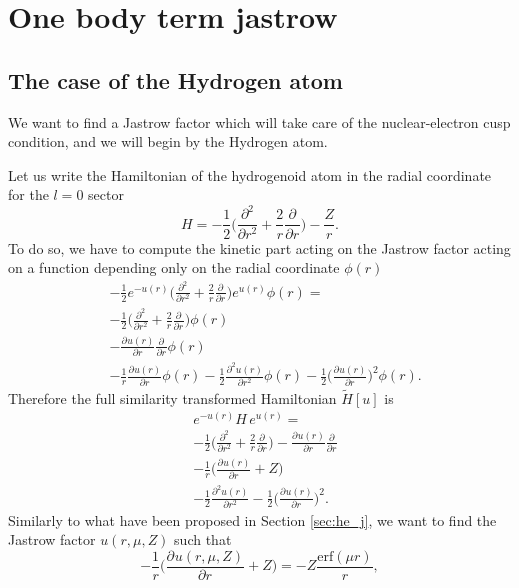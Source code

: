 \documentclass[aip,jcp,reprint,noshowkeys,superscriptaddress]{revtex4-1}
\newcommand{\deriv}[3]{\frac{\partial^{#3} #1}{\partial {#2}^{#3}}}
\begin{document}
\section{One body term jastrow}
\subsection{The case of the Hydrogen atom}
We want to find a Jastrow factor which will take care of the nuclear-electron cusp condition, and we will begin by the Hydrogen atom.  

Let us write the Hamiltonian of the hydrogenoid atom in the radial coordinate for the $l=0$ sector 
\begin{equation}
 H = -\frac{1}{2} \big( \deriv{}{r}{2} + \frac{2}{r} \deriv{}{r}{}\big) - \frac{Z}{r}.
\end{equation}
To do so, we have to compute the kinetic part acting on the Jastrow factor acting on a function depending only on the radial coordinate $\phi( r)$
\begin{equation}
 \label{eq:h_atom_j}
 \begin{aligned}
 & -\frac{1}{2}e^{-u(r)}\big(\deriv{}{r}{2} + \frac{2}{r} \deriv{}{r}{} \big) e^{u(r)}\phi(r)  = \\
 & -\frac{1}{2}\big( \deriv{}{r}{2} + \frac{2}{r} \deriv{}{r}{} \big) \phi(r) \\
 &-\deriv{u(r)}{r}{}\deriv{}{r}{}\phi(r) \\
 &-\frac{1}{r}\deriv{u(r)}{r}{}\phi(r)  - \frac{1}{2}\deriv{u(r)}{r}{2}\phi(r)  -  \frac{1}{2}\bigg(\deriv{u(r)}{r}{} \bigg)^2 \phi(r).
 \end{aligned}
\end{equation}
Therefore the full similarity transformed Hamiltonian $\tilde{H}[u]$ is 
\begin{equation}
 \begin{aligned}
 \label{eq:one_e_0}
 & e^{-u(r)}H\,e^{u(r)} = \\
 & -\frac{1}{2}\big( \deriv{}{r}{2} + \frac{2}{r} \deriv{}{r}{} \big) -\deriv{u(r)}{r}{}\deriv{}{r}{}\\
 &-\frac{1}{r}\bigg(\deriv{u(r)}{r}{} + Z \bigg) \\ 
 & - \frac{1}{2}\deriv{u(r)}{r}{2} -  \frac{1}{2}\bigg(\deriv{u(r)}{r}{} \bigg)^2.
 \end{aligned}
\end{equation}
Similarly to what have been proposed in Section \ref{sec:he_j}, we want to find the Jastrow factor $u(r,\mu,Z)$ such that 
\begin{equation}
 \label{eq:one_e_01}
 -\frac{1}{r}\bigg(\deriv{u(r,\mu,Z)}{r}{} + Z \bigg) = -Z\frac{\text{erf}(\mu r)}{r},
\end{equation}
\end{document}

